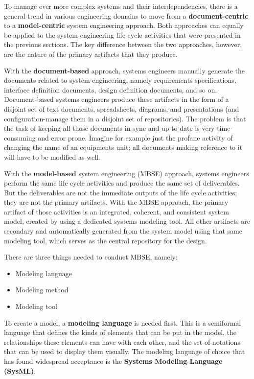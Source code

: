 To manage ever more complex systems and their interdependencies, there is a general trend in various engineering domains to move from a \textbf{document-centric} to a \textbf{model-centric} system engineering approach. Both approaches can equally be applied to the system engineering life cycle activities that were presented in the previous sections. The key difference between the two approaches, however, are the nature of the primary artifacts that they produce. 

With the \textbf{document-based} approach, systems engineers manually generate the documents related to system engineering, namely requirements specifications, interface definition documents, design definition documents, and so on. Document-based systems engineers produce these artifacts in the form of a disjoint set of text documents, spreadsheets, diagrams, and presentations (and configuration-manage them in a disjoint set of repositories). The problem is that the task of keeping all those documents in sync and up-to-date is very time-consuming and error prone. Imagine for example just the profane activity of changing the name of an equipments unit; all documents making reference to it will have to be modified as well.

With the \textbf{model-based} system engineering (MBSE) approach, systems engineers perform the same life cycle activities and produce the same set of deliverables. But the deliverables are not the immediate outputs of the life cycle activities; they are not the primary artifacts. With the MBSE approach, the primary artifact of those activities is an integrated, coherent, and consistent system model, created by using a dedicated systems modeling tool. All other artifacts are secondary and automatically generated from the system model using that same modeling tool, which serves as the central repository for the design.

There are three things needed to conduct MBSE, namely:

\begin{itemize}
\item Modeling language
\item Modeling method
\item Modeling tool
\end{itemize}

To create a model, a \textbf{modeling language} is needed first. This is a semiformal language that defines the kinds of elements that can be put in the model, the relationships these elements can have with each other, and the set of notations that can be used to display them visually. The modeling language of choice that has found widespread acceptance is the \textbf{Systems Modeling Language (SysML)}.

